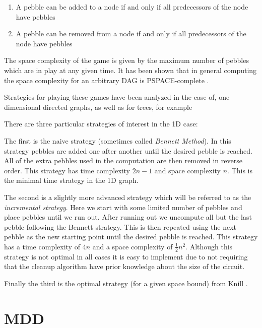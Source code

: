 \begin{enumerate}

  \item A pebble can be added to a node if and only if all predecessors of the
    node have pebbles

  \item A pebble can be removed from a node if and only if all predecessors of
    the node have pebbles

\end{enumerate}

The space complexity of the game is given by the maximum number of pebbles which
are in play at any given time. It has been shown that in general computing the
space complexity for an arbitrary DAG is PSPACE-complete \cite{chan13}.

Strategies for playing these games have been analyzed in the case of, one
dimensional directed graphs, as well as for trees\cite{peb16}, for example

There are three particular strategies of interest in the 1D case:

The first is the naive strategy (sometimes called \emph{Bennett Method}). In
this strategy pebbles are added one after another until the desired pebble is reached.
All of the extra pebbles used in the computation are then removed in reverse
order. This strategy has time complexity $2n-1$ and space complexity
$n$.  This is the minimal time strategy in the 1D graph.

The second is a slightly more advanced strategy which will be referred to as the
\emph{incremental strategy}. Here we start with some limited number of pebbles
and place pebbles until we run out. After running out we uncompute all but the
last pebble following the Bennett strategy. This is then repeated using the next
pebble as the new starting point until the desired pebble is reached. This
strategy has a time complexity of $4n$ and a space complexity of
$\frac{1}{2}n^2$. Although this strategy is not optimal in all cases it is easy
to implement due to not requiring that the cleanup algorithm have prior
knowledge about the size of the circuit.

Finally the third is the optimal strategy (for a given space bound) from Knill \cite{knill:95}.

\section{MDD}

